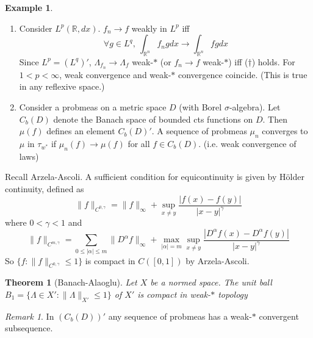 \documentclass{article}
\theoremstyle{definition}
\newtheorem{example}[defn]{Example}
\theoremstyle{remark}
\newtheorem{rem}{Remark}
\theoremstyle{plain}
\newtheorem{thm}[defn]{Theorem}
\newcommand{\RR}{\mathbb{R}}
\begin{document}
\begin{example}\
    \begin{enumerate}[1)]
        \item Consider $L^p(\RR,dx)$. $f_n\to f$ weakly in $L^p$ iff \[\forall g\in L^q,\ \int_{\RR^n}f_ngdx\to\int_{\RR^n}fgdx\tag{$\dagger$}\]
        Since $L^p=(L^q)'$, $\Lambda_{f_n}\to\Lambda_{f}$ weak-$\ast$ (or $f_n\to f$ weak-$\ast$) iff ($\dagger$) holds. For $1<p<\infty$, weak convergence and weak-$\ast$ convergence coincide. (This is true in any reflexive space.)
        \item Consider a probmeas on a metric space $D$ (with Borel $\sigma$-algebra). Let $C_b(D)$ denote the Banach space of bounded cts functions on $D$. Then $\mu(f)$ defines an element $C_b(D)'$. A sequence of probmeas $\mu_n$ converges to $\mu$ in $\tau_{w^\ast}$ if $\mu_n(f)\to \mu(f)$ for all $f\in C_b(D)$. (i.e. weak convergence of laws)
    \end{enumerate}
\end{example}
Recall Arzela-Ascoli. A sufficient condition for equicontinuity is given by H\"older continuity, defined as
\[\|f\|_{C^{0,\gamma}}=\|f\|_\infty+\sup_{x\neq y}\dfrac{|f(x)-f(y)|}{|x-y|^\gamma}\]
where $0<\gamma<1$ and 
\[\|f\|_{C^{m,\gamma}}=\sum_{0\le|\alpha|\le m}\|D^\alpha f\|_\infty+\max_{|\alpha|=m}\sup_{x\neq y}\dfrac{|D^\alpha f(x)-D^\alpha f(y)|}{|x-y|^\gamma}\]
So $\{f:\|f\|_{C^{0,\gamma}}\le 1\}$ is compact in $C([0,1])$ by Arzela-Ascoli.

\begin{thm}[Banach-Alaoglu]
    Let $X$ be a normed space. The unit ball $B_1=\{\Lambda\in X':\|\Lambda\|_{X'}\le 1\}$ of $X'$ is compact in weak-$\ast$ topology
\end{thm}
\begin{rem}
    In $(C_b(D))'$ any sequence of probmeas has a weak-$\ast$ convergent subsequence.
\end{rem}
\end{document}
